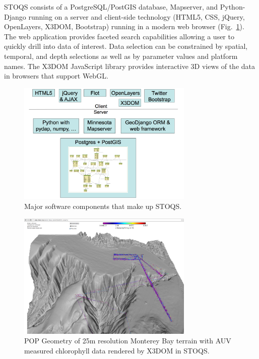 \documentclass[annualconference]{acmsiggraph}  %
\begin{document}
STOQS consists of a PostgreSQL/PostGIS database, Mapserver, and Python-Django running on a server and client-side technology (HTML5, CSS, jQuery, OpenLayers, X3DOM, Bootstrap) running in a modern web browser (Fig.~\ref{fig:STOQSArch}). The web application provides faceted search capabilities allowing a user to quickly drill into data of interest. Data selection can be constrained by spatial, temporal, and depth selections as well as by parameter values and platform names. The X3DOM JavaScript library provides interactive 3D views of the data in browsers that support WebGL.  

\begin{figure}[htbp]
\centering
\includegraphics[width=3.3in]{STOQS_Architecture_withX3DOM.png}
\caption{Major software components that make up STOQS.}
\label{fig:STOQSArch}
\end{figure}




\begin{figure}[htbp]
\centering
\includegraphics[width=3.3in]{Monterey25_lrauvs.png}
\caption{POP Geometry of 25m resolution Monterey Bay terrain with AUV measured chlorophyll data rendered by X3DOM in STOQS.}
\label{fig:Monterey25_lrauvs}
\end{figure}
\end{document}
